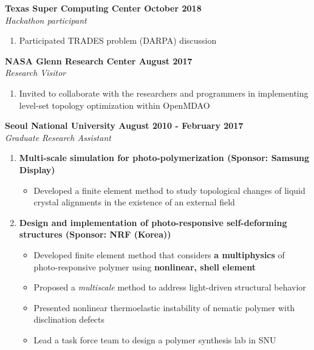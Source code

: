 \documentclass[margin, 10pt]{res} %
\begin{document}
\begin{resume}
\textbf{Texas Super Computing Center \hfill October 2018} \\
\textit{Hackathon participant}

\begin{enumerate}
    \item Participated TRADES problem (DARPA) discussion
\end{enumerate}

\textbf{NASA Glenn Research Center \hfill August 2017} \\
\textit{Research Visitor}

\begin{enumerate}
    \item Invited to collaborate with the researchers and programmers in implementing level-set topology optimization within OpenMDAO
\end{enumerate}

\textbf{Seoul National University \hfill August 2010 - February 2017} \\
\textit{Graduate Research Assistant}

\begin{enumerate}
    \item \textbf{Multi-scale simulation for photo-polymerization (Sponsor: Samsung Display)}
    \begin{itemize}
        \item Developed a finite element method to study topological changes of liquid crystal alignments in the existence of an external field 
    \end{itemize}
    
    \item \textbf{Design and implementation of photo-responsive self-deforming structures 
    (Sponsor: NRF (Korea))}
    \begin{itemize}
        \item Developed finite element method that considers \textbf{a multiphysics} of photo-responsive polymer using \textbf{nonlinear, shell element}
        \item Proposed a \textit{multiscale} method to address light-driven structural behavior
        \item Presented nonlinear thermoelastic instability of nematic polymer with disclination defects
        \item Lead a task force team to design a polymer synthesis lab in SNU
    \end{itemize}
    

\end{enumerate}
\end{resume}
\end{document}
